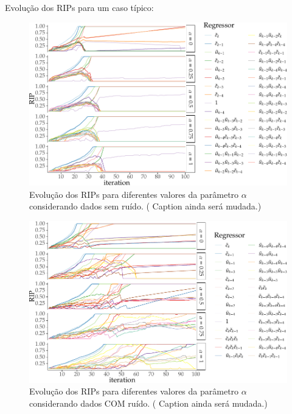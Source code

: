 \begin{exmp} \label{ex:52}


  Evolução dos RIPs para um caso típico:

  \begin{figure}[H]
    \centering
    \includegraphics{Figs/Cap5/ex51_rips_evol_SR.tex.pdf}
    \caption{Evolução dos RIPs para diferentes valores da parâmetro $\alpha$ considerando dados sem ruído. ({\color{red} Caption ainda será mudada.})}
    \label{fig:exp51_ev_rips_a1}
  \end{figure}

  \begin{figure}[H]
    \centering
    \includegraphics{Figs/Cap5/ex51_rips_evol_CR.tex.pdf}
    \caption{Evolução dos RIPs para diferentes valores da parâmetro $\alpha$ considerando dados COM ruído. ({\color{red} Caption ainda será mudada.})}
    \label{fig:exp51_ev_rips_a1}
  \end{figure}




\end{exmp}
